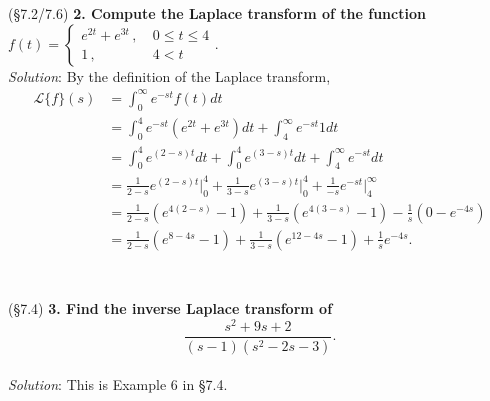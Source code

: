 \documentclass[12pt]{article}
\newcommand{\Laplace}{\mathscr{L}}
\begin{document}
~\\~\\
(\S 7.2/7.6) \textbf{2. Compute the Laplace transform of the function}
$f(t) = \begin{cases} e^{2t} + e^{3t} \, , &\ 0 \leq t \leq 4 \\ 1\, ,&\ 4 < t \end{cases}.$
~\\
\emph{Solution}:  By the definition of the Laplace transform,
$$\begin{aligned}
\Laplace \{f\}(s)	&= \int_0^\infty e^{-st} f(t) dt \\
					&= \int_0^4 e^{-st} (e^{2t} + e^{3t} ) dt + \int_4^\infty e^{-st} 1 dt \\
					&= \int_0^4 e^{(2-s)t} dt + \int_0^4 e^{(3-s)t} dt + \int_4^\infty e^{-st} dt \\
					&= \frac{1}{2-s} e^{(2-s)t} \Big|_0^4 + \frac{1}{3-s} e^{(3-s)t} \Big|_0^4 + \frac{1}{-s} e^{-st} \Big|_4^\infty \\
					&= \frac{1}{2-s} (e^{4(2-s)} - 1) + \frac{1}{3-s} ( e^{4(3-s)} - 1) - \frac{1}{s}(0 - e^{-4s}) \\
					&= \frac{1}{2-s} (e^{8-4s} - 1) + \frac{1}{3-s} ( e^{12 - 4s} - 1) + \frac{1}{s}e^{-4s}. \\
\end{aligned}$$
~\\~\\
(\S 7.4) \textbf{3. Find the inverse Laplace transform of}
$$\frac{s^2 + 9s + 2}{(s-1)(s^2 - 2s - 3)}.$$
~\\
\emph{Solution}: This is Example 6 in \S 7.4.
\end{document}
